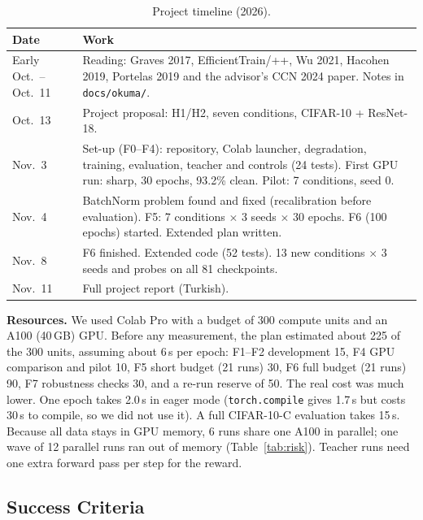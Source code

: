\documentclass[a4paper,12pt]{report}
\begin{document}
\begin{table}[htbp]
\caption{Project timeline (2026).}
\label{tab:timeline}
\begin{center}
\small
\begin{tabular}{|l|P{10.8cm}|} \hline
\textbf{Date} & \textbf{Work} \\ \hline
Early Oct.\ -- Oct.\ 11 & Reading: Graves 2017, EfficientTrain/++, Wu 2021, Hacohen 2019, Portelas 2019 and the advisor's CCN 2024 paper. Notes in \texttt{docs/okuma/}. \\ \hline
Oct.\ 13 & Project proposal: H1/H2, seven conditions, CIFAR-10 + ResNet-18. \\ \hline
Nov.\ 3 & Set-up (F0--F4): repository, Colab launcher, degradation, training, evaluation, teacher and controls (24 tests). First GPU run: sharp, 30 epochs, 93.2\% clean. Pilot: 7 conditions, seed 0. \\ \hline
Nov.\ 4 & BatchNorm problem found and fixed (recalibration before evaluation). F5: 7 conditions $\times$ 3 seeds $\times$ 30 epochs. F6 (100 epochs) started. Extended plan written. \\ \hline
Nov.\ 8 & F6 finished. Extended code (52 tests). 13 new conditions $\times$ 3 seeds and probes on all 81 checkpoints. \\ \hline
Nov.\ 11 & Full project report (Turkish). \\ \hline
\end{tabular}
\end{center}
\end{table}

\textbf{Resources.} We used Colab Pro with a budget of 300 compute units and an A100 (40\,GB) GPU. Before any measurement, the plan estimated about 225 of the 300 units, assuming about 6\,s per epoch: F1--F2 development 15, F4 GPU comparison and pilot 10, F5 short budget (21 runs) 30, F6 full budget (21 runs) 90, F7 robustness checks 30, and a re-run reserve of 50. The real cost was much lower. One epoch takes 2.0\,s in eager mode (\texttt{torch.compile} gives 1.7\,s but costs 30\,s to compile, so we did not use it). A full CIFAR-10-C evaluation takes 15\,s. Because all data stays in GPU memory, 6 runs share one A100 in parallel; one wave of 12 parallel runs ran out of memory (Table~\ref{tab:risk}). Teacher runs need one extra forward pass per step for the reward.

\subsection{Success Criteria}
\end{document}
